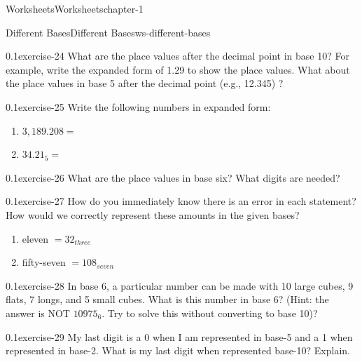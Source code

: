 \documentclass[twoside,11pt,]{book}
\begin{document}
\begin{chapterptx}{Worksheets}{}{Worksheets}{}{}{chapter-1}
\begin{worksheet-section-numberless}{Different Bases}{}{Different Bases}{}{}{ws-different-bases}
\begin{divisionexercise}{2}{}{0.1}{exercise-24}
\hypertarget{p-45}{}%
What are the place values after the decimal point in base 10? For example, write the expanded form of 1.29 to show the place values. What about the place values in base 5 after the decimal point (e.g., 12.345) ?%
\end{divisionexercise}%
\begin{divisionexercise}{3}{}{0.1}{exercise-25}%
\hypertarget{p-46}{}%
Write the following numbers in expanded form:%
\leavevmode%
\begin{enumerate}[label=(\alph*)]
\item\hypertarget{li-5}{}\(3,189.208 = \)%
\item\hypertarget{li-6}{}\(34.21_5      = \)%
\end{enumerate}
\end{divisionexercise}%
\begin{divisionexercise}{4}{}{0.1}{exercise-26}%
\hypertarget{p-47}{}%
What are the place values in base six?  What digits are needed?%
\end{divisionexercise}%
\begin{divisionexercise}{5}{}{0.1}{exercise-27}%
\hypertarget{p-48}{}%
How do you immediately know there is an error in each statement?  How would we correctly represent these amounts in the given bases?%
\leavevmode%
\begin{enumerate}[label=(\alph*)]
\item\hypertarget{li-7}{}eleven \(= 32_{three}\)%
\item\hypertarget{li-8}{}fifty-seven \(= 108_{seven}\)%
\end{enumerate}
\end{divisionexercise}%
\begin{divisionexercise}{6}{}{0.1}{exercise-28}%
\hypertarget{p-49}{}%
In base 6, a particular number can be made with 10 large cubes, 9 flats, 7 longs, and 5 small cubes.  What is this number in base 6? (Hint: the answer is NOT \(10975_6 \). Try to solve this without converting to base 10)?%
\end{divisionexercise}%
\begin{divisionexercise}{7}{}{0.1}{exercise-29}%
\hypertarget{p-50}{}%
My last digit is a 0 when I am represented in base-5 and a 1 when represented in base-2.  What is my last digit when represented base-10? Explain.%
\end{divisionexercise}%
\end{worksheet-section-numberless}
\restoregeometry
%
%
\typeout{************************************************}

\end{chapterptx}
\end{document}
